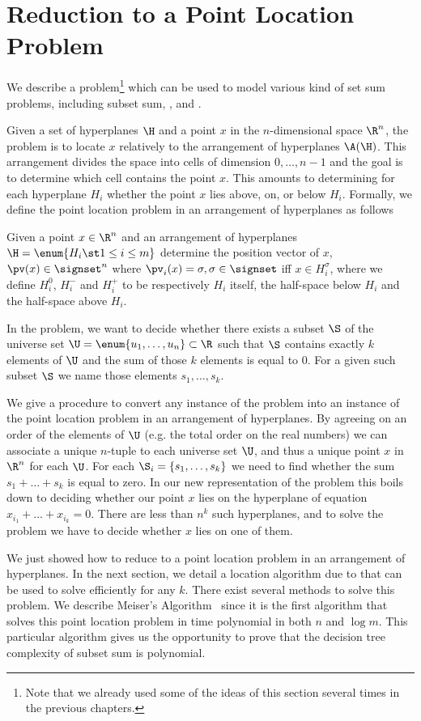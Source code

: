 \section{Reduction to a Point Location Problem}

We describe a problem\footnote{%
Note that we already used some of the ideas of this section several times in
the previous chapters.%
}
which can be used to model
various kind of set sum problems, including subset sum, \kSUM, and \kLDT.

Given a set of hyperplanes \(\H\) and a point \(x\) in the \(n\)-dimensional
space \(\R^n\), the problem is to locate \(x\) relatively
to the arrangement of hyperplanes \(\A(\H)\). This arrangement divides the space
into cells of dimension \(0,\ldots,n-1\) and the goal is to determine which
cell contains the point \(x\). This amounts to determining for each
hyperplane \(H_i\) whether the point \(x\) lies above, on, or below \(H_i\).
Formally, we define the point location problem in an arrangement of hyperplanes as
follows
\begin{problem}
Given a point $x \in \R^n$ and an arrangement of hyperplanes $\H = \enum{ H_i
\st 1 \leq i \leq m }$ determine the position vector of $x$, $\pv(x) \in
\signset^n$ where $\pv_i(x) = \sigma, \sigma \in \signset$ iff $x \in
H_i^{\sigma}$, where we define $H_i^{0}$, $H_i^{-}$ and $H_i^{+}$ to be
respectively $H_i$ itself, the half-space below $H_i$ and the half-space above
$H_i$.
\end{problem}
In the \kSUM problem, we want to decide whether there exists a subset \(\S\) of the
universe set \(\U = \enum{u_1,\ldots,u_n} \subset \R\) such that
$\S$
contains exactly $k$ elements of $\U$ and the sum of those $k$
elements is equal to $0$. For a given such subset $\S$ we name those elements
$s_1, \dots, s_k$.

We give a procedure to convert any instance of the \kSUM problem into an
instance of the point location problem in an arrangement of hyperplanes.
By agreeing on an order of the elements of $\U$ (e.g. the total order on
the real numbers) we can associate a unique $n$-tuple to each universe set $\U$,
and thus a unique point $x$ in $\R^n$ for each $\U$.
For each $\S_i = \left\{s_1, \dots, s_k\right\}$ we need to find whether the sum $s_1
+ \dots + s_k$ is equal to zero. In our new representation of the problem this
boils down to deciding whether our point $x$ lies on the hyperplane of
equation $x_{i_1} + \dots + x_{i_k} = 0$. There are less than $n^k$ such
hyperplanes, and to solve the problem
we have to decide whether \(x\) lies on one of them.

We just showed how to reduce \kSUM to a
point location problem in an arrangement of hyperplanes. In the next section,
we detail a location algorithm due to \citet*{meiser:1993} that can be used to
solve \kSUM efficiently for any $k$. There exist several methods to solve
this problem. We describe Meiser's Algorithm~\cite{meiser:1993} since it
is the first algorithm that solves this point location problem in time
polynomial in both $n$ and $\log m$. This particular
algorithm gives us the opportunity to prove that the decision tree complexity
of subset sum is polynomial.

